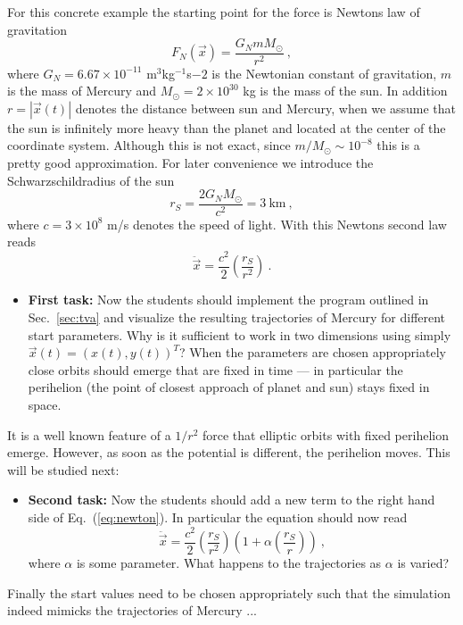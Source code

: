 \documentclass[12pt]{iopart}
\begin{document}
For this concrete example the starting point for the force is Newtons law
of gravitation
\begin{equation}
F_N(\vec x) = \frac{G_N m M_\odot}{r^2} \ ,
\end{equation}
where $G_N=6.67\times 10^{-11}$ m$^3$kg$^{-1}$s${-2}$ is the Newtonian constant of gravitation,
$m$ is the mass of Mercury and $M_\odot=2\times 10^{30}$ kg is the mass of the sun.
In addition $r=|\vec x(t)|$ denotes the distance between sun and Mercury, when we assume that the sun
is infinitely more heavy than the planet and located at the center of the coordinate system. Although this is not exact, since $m/M_\odot\sim 10^{-8}$ this is
a pretty good approximation. For later convenience we introduce the Schwarzschildradius of the sun
\begin{equation}
r_S=\frac{2G_N  M_\odot}{c^2} = 3 \ \mbox{km} \ ,
\end{equation}
where $c=3\times 10^8$ m/s denotes the speed of light.
With this Newtons second law reads 
\begin{equation}
\ddot{\vec x} = \frac{c^2}{2}\left(\frac{r_S}{r^2}\right) \ .
\label{eq:newton}
\end{equation}
\begin{itemize}
\item{\bf First task:}
Now the students should implement the program outlined in Sec.~\ref{sec:tva} and visualize the resulting
trajectories of Mercury for different start parameters.
Why is it sufficient to work in two dimensions using simply 
$\vec x(t)=(x(t),y(t))^T$?
 When the parameters are chosen appropriately close
orbits should emerge that are fixed in time --- in particular the perihelion (the point of closest approach
of planet and sun) stays fixed in space.
\end{itemize}
It is a well known feature of a $1/r^2$ force that elliptic orbits with fixed perihelion emerge. However, as soon
as the potential is different, the perihelion moves. This will be studied next:
\begin{itemize}
\item{\bf Second task:}
Now the students should add a new term to the right hand side of Eq.~(\ref{eq:newton}). In particular the equation should now
read 
\begin{equation}
\ddot{\vec x} = \frac{c^2}{2}\left(\frac{r_S}{r^2}\right)\left(1+\alpha\left(\frac{r_S}{r}\right)\right) \ ,
\label{eq:newton_art}
\end{equation}
where $\alpha$ is some parameter. What happens to the trajectories as $\alpha$ is varied?
\end{itemize}
Finally the start values need to be chosen appropriately such that the simulation indeed mimicks the trajectories
of Mercury ...
\end{document}
